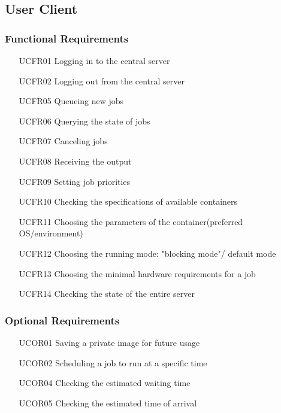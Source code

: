 \subsection{User Client}


  \subsubsection{Functional Requirements} 
  \begin{itemize}
    \item [UCFR01] Logging in to the central server
    \item [UCFR02] Logging out from the central server
    \item [UCFR05] Queueing new jobs
    \item [UCFR06] Querying the state of jobs
    \item [UCFR07] Canceling jobs
    \item [UCFR08] Receiving the output
    \item [UCFR09] Setting job priorities 
    \item [UCFR10] Checking the specifications of available containers
    \item [UCFR11] Choosing the parameters of the container(preferred OS/environment)
    \item [UCFR12] Choosing the running mode: "blocking mode"/ default mode
    \item [UCFR13] Choosing the minimal hardware requirements for a job 
    \item [UCFR14] Checking the state of the entire server
  \end{itemize}


  \subsubsection{Optional Requirements} 
  \begin{itemize}
    \item [UCOR01] Saving a private image for future usage
    \item [UCOR02] Scheduling a job to run at a specific time
    \item [UCOR04] Checking the estimated waiting time
    \item [UCOR05] Checking the estimated time of arrival
  \end{itemize}


